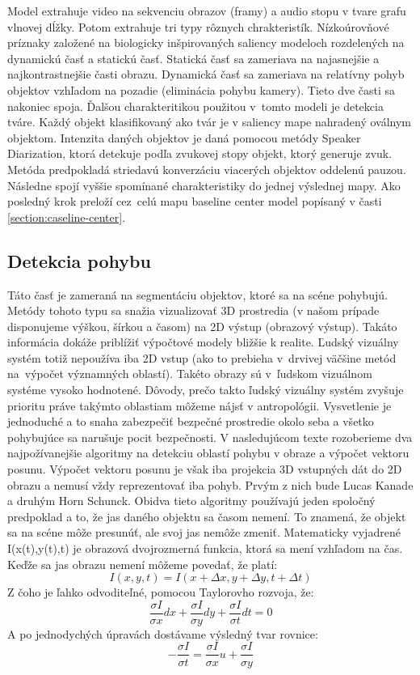 Model extrahuje video na sekvenciu obrazov (framy) a audio stopu v tvare grafu vlnovej dĺžky.
Potom extrahuje tri typy rôznych chrakteristík.
Nízkoúrovňové príznaky založené na biologicky inšpirovaných saliency modeloch rozdelených na dynamickú časť a statickú časť.
Statická časť sa zameriava na najasnejšie a najkontrastnejšie časti obrazu.
Dynamická časť sa zameriava na relatívny pohyb objektov vzhľadom na pozadie (eliminácia pohybu kamery).
Tieto dve časti sa nakoniec spoja.
Ďalšou charakteritikou použitou v~tomto modeli je detekcia tváre.
Každý objekt klasifikovaný ako tvár je v saliency mape nahradený oválnym objektom.
Intenzita daných objektov je daná pomocou metódy Speaker Diarization\cite{sound-courot-2}, ktorá detekuje podľa zvukovej stopy objekt, ktorý generuje zvuk.
Metóda predpokladá striedavú konverzáciu viacerých objektov oddelenú pauzou.
Následne spojí vyššie spomínané charakteristiky do jednej výslednej mapy.
Ako posledný krok preloží cez~celú mapu baseline center model popísaný v časti \ref{section:caseline-center}.

\subsection{Detekcia pohybu}
Táto časť je zameraná na segmentáciu objektov, ktoré sa na scéne pohybujú.
Metódy tohoto typu sa snažia vizualizovať 3D prostredia (v našom prípade disponujeme výškou, šírkou a časom) na 2D výstup (obrazový výstup).
Takáto informácia dokáže priblížiť výpočtové modely bližšie k realite.
Ľudský vizuálny systém totiž nepoužíva iba 2D vstup (ako to prebieha v~drvivej väčšine metód na~výpočet významných oblastí).
Takéto obrazy sú v~ľudskom vizuálnom systéme vysoko hodnotené.
Dôvody, prečo takto ľudský vizuálny systém zvyšuje prioritu práve takýmto oblastiam môžeme nájsť v antropológii.
Vysvetlenie je jednoduché a to snaha zabezpečiť bezpečné prostredie okolo seba a všetko pohybujúce sa narušuje pocit bezpečnosti.
V nasledujúcom texte rozoberieme dva najpožívanejšie algoritmy na detekciu oblastí pohybu v obraze a výpočet vektoru posunu.
Výpočet vektoru posunu je však iba projekcia 3D vstupných dát do 2D obrazu a nemusí vždy reprezentovať iba pohyb.
Prvým z nich bude Lucas Kanade\cite{lucas-kanade} a druhým Horn Schunck\cite{hs-original}.
Obidva tieto algoritmy používajú jeden spoločný predpoklad a to, že jas daného objektu sa časom nemení.
To znamená, že objekt sa na scéne môže presunúť, ale svoj jas nemôže zmeniť.
Matematicky vyjadrené I(x(t),y(t),t) je obrazová dvojrozmerná funkcia, ktorá sa mení vzhľadom na čas.
Keďže sa jas obrazu nemení môžeme povedať, že platí:
\begin{equation}
  I(x,y,t) = I(x + \Delta x ,y + \Delta y, t + \Delta t) 
\end{equation}
Z čoho je ľahko odvoditeľné, pomocou Taylorovho rozvoja, že:
\begin{equation}  
  \frac{\sigma I}{\sigma x}dx + \frac{\sigma I}{\sigma y}dy + \frac{\sigma I}{\sigma t}dt = 0
\end{equation}
A po jednodychých úpravách dostávame výsledný tvar rovnice:
\begin{equation}
- \frac{\sigma I}{\sigma t} = \frac{\sigma I}{\sigma x}u + \frac{\sigma I}{\sigma y}
\end{equation}


